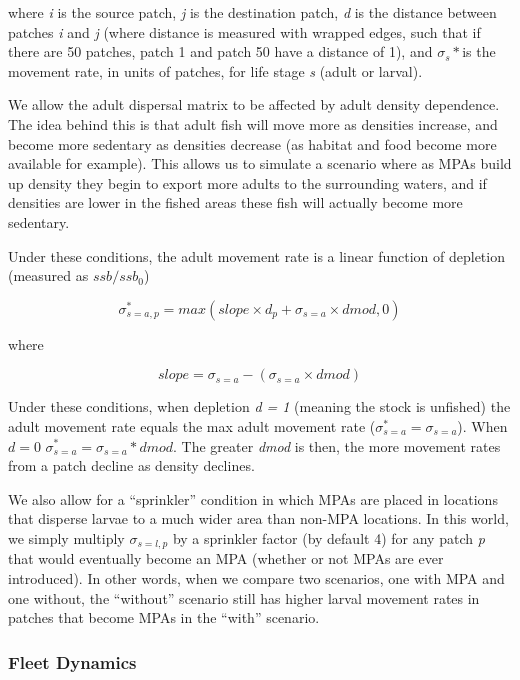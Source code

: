 \documentclass[]{article}
\begin{document}
where \emph{i} is the source patch, \emph{j} is the destination patch, \emph{d} is the distance between patches \emph{i} and \emph{j} (where distance is measured with wrapped edges, such that if there are 50 patches, patch 1 and patch 50 have a distance of 1), and \(\sigma_s*\)is the movement rate, in units of patches, for life stage \emph{s} (adult or larval).

We allow the adult dispersal matrix to be affected by adult density dependence. The idea behind this is that adult fish will move more as densities increase, and become more sedentary as densities decrease (as habitat and food become more available for example). This allows us to simulate a scenario where as MPAs build up density they begin to export more adults to the surrounding waters, and if densities are lower in the fished areas these fish will actually become more sedentary.

Under these conditions, the adult movement rate is a linear function of depletion (measured as \(ssb/ssb_0\))

\begin{equation}
\sigma_{s=a,p}^* = max(slope\times{d _p+ \sigma_{s=a} \times dmod},0)
  \label{eq:ddmove1}
\end{equation}

where

\begin{equation}
slope = \sigma_{s=a} - ( \sigma_{s=a} \times dmod)
  \label{eq:ddmove2}
\end{equation}

Under these conditions, when depletion \emph{d = 1} (meaning the stock is unfished) the adult movement rate equals the max adult movement rate (\(\sigma_{s=a}^* = \sigma_{s=a}\)). When \(d=0\) \(\sigma_{s=a}^* = \sigma_{s=a} * dmod\). The greater \emph{dmod} is then, the more movement rates from a patch decline as density declines.

We also allow for a ``sprinkler'' condition in which MPAs are placed in locations that disperse larvae to a much wider area than non-MPA locations. In this world, we simply multiply \(\sigma_{s=l,p}\) by a sprinkler factor (by default 4) for any patch \emph{p} that would eventually become an MPA (whether or not MPAs are ever introduced). In other words, when we compare two scenarios, one with MPA and one without, the ``without'' scenario still has higher larval movement rates in patches that become MPAs in the ``with'' scenario.

\hypertarget{fleet-dynamics}{%
\subsubsection{Fleet Dynamics}\label{fleet-dynamics}}
\end{document}
